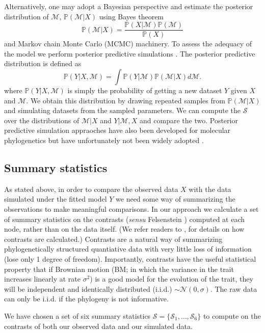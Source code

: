 \documentclass[a4paper,12pt]{article}
\begin{document}
Alternatively, one may adopt a Bayesian perspective and estimate the posterior distribution of $\mathcal{M}$, $\mathbb{P}(\mathcal{M}|X)$ using Bayes theorem
\[\mathbb{P}(\mathcal{M}|X) = \frac{\mathbb{P}(X|\mathcal{M})\mathbb{P}(\mathcal{M})}{\mathbb{P}(X)} \]
and Markov chain Monte Carlo (MCMC) machinery. To assess the adequacy of the model we perform posterior predictive simulations \citep{Rubin1984, Gelman1996}. The posterior predictive distribution is defined as
\[\mathbb{P}(Y|X,\mathcal{M}) = \int \mathbb{P}(Y|\mathcal{M})\mathbb{P}(\mathcal{M}|X)d\mathcal{M}. \]
where $\mathbb{P}(Y|X,\mathcal{M})$ is simply the probability of getting a new dataset $Y$ given $X$ and $\mathcal{M}$. We obtain this distribution by drawing repeated samples from $\mathbb{P}(\mathcal{M}|X)$ and simulating datasets from the sampled parameters. We can compute the $\mathcal{S}$ over the distributions of $\mathcal{M}|X$ and $Y|\mathcal{M},X$ and compare the two. Posterior predictive simulation appraoches have also been developed for molecular phylogenetics \citep{Bollback2002, Reid2013, Lewis2013, Brown2013} but have unfortunately not been widely adopted \citep{Brown2013}.


\subsection{Summary statistics}
As stated above, in order to compare the observed data $X$ with the data simulated under the fitted model $Y$ we need some way of summarizing the observations to make meaningful comparisons. 
In our approach we calculate a set of summary statistics on the contrasts (\textit{sensu} Felsenstein \citep{Felsenstein1985}) computed at each node, rather than on the data itself. (We refer readers to \citep{Felsenstein1985, Rohlf2001, Blomberg2012}, for details on how contrasts are calculated.) Contrasts are a natural way of summarizing phylogenetically structured quantiative data with very little loss of information (lose only 1 degree of freedom). Importantly, contrasts have the useful statistical property that if Brownian motion (BM; in which the variance in the trait increases linearly at rate $\sigma^2$) is a good model for the evolution of the trait, they will be independent and identically distributed (i.i.d.) $\sim \mathcal{N}(0, \sigma)$. The raw data can only be i.i.d. if the phylogeny is not informative. 

We have chosen a set of six summary statistics $\mathcal{S} = \lbrace \mathcal{S}_1, \ldots, \mathcal{S}_6 \rbrace$ to compute on the contrasts of both our observed data and our simulated data.
\end{document}
